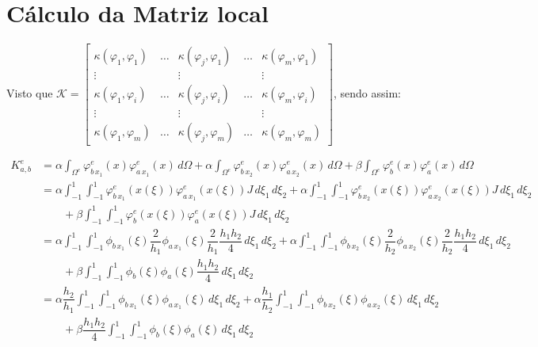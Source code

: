\section{Cálculo da Matriz local}

  Visto que $\displaystyle \mathcal{K} = \begin{bmatrix}
    \kappa(\varphi_1, \varphi_1) & \dots & \kappa(\varphi_j, \varphi_1) & \dots & \kappa(\varphi_m, \varphi_1)\\
    \vdots & & \vdots & & \vdots \\
    \kappa(\varphi_1, \varphi_i) & \dots & \kappa(\varphi_j, \varphi_i) & \dots & \kappa(\varphi_m, \varphi_i)\\
    \vdots & & \vdots & & \vdots \\
    \kappa(\varphi_1, \varphi_m) & \dots & \kappa(\varphi_j, \varphi_m) & \dots & \kappa(\varphi_m, \varphi_m)
  \end{bmatrix}$, sendo assim:

  \begin{align*}
    K^e_{a,b} &= \alpha \int_{\Omega^e} \varphi^e_{b\,x_1}(x) \varphi^e_{a\,x_1}(x) \, d\Omega + \alpha \int_{\Omega^e} \varphi^e_{b\,x_2}(x) \varphi^e_{a\,x_2}(x) \, d\Omega + \beta \int_{\Omega^e} \varphi^e_b(x) \varphi^e_a(x) \, d\Omega \\
    &= \alpha \int_{-1}^{1}\int_{-1}^{1} \varphi^e_{b\,x_1}(x(\xi)) \varphi^e_{a\,x_1}(x(\xi)) J \, d\xi_1 \, d\xi_2 + \alpha \int_{-1}^{1}\int_{-1}^{1} \varphi^e_{b\,x_2}(x(\xi)) \varphi^e_{a\,x_2}(x(\xi)) J \, d\xi_1 \, d\xi_2 \\
    &\quad\quad + \beta \int_{-1}^{1}\int_{-1}^{1} \varphi^e_b(x(\xi)) \varphi^e_a(x(\xi)) J \, d\xi_1 \, d\xi_2 \\
    &= \alpha \int_{-1}^{1}\int_{-1}^{1} \phi_{b\,x_1}(\xi)\dfrac{2}{h_1} \phi_{a\,x_1}(\xi)\dfrac{2}{h_1} \dfrac{h_1h_2}{4} \, d\xi_1 \, d\xi_2 + \alpha \int_{-1}^{1}\int_{-1}^{1} \phi_{b\,x_2}(\xi)\dfrac{2}{h_2} \phi_{a\,x_2}(\xi)\dfrac{2}{h_2} \dfrac{h_1h_2}{4} \, d\xi_1 \, d\xi_2 \\
    &\quad\quad + \beta \int_{-1}^{1}\int_{-1}^{1} \phi_b(\xi) \phi_a(\xi) \dfrac{h_1h_2}{4} \, d\xi_1 \, d\xi_2 \\
    &= \alpha\dfrac{h_2}{h_1} \int_{-1}^{1}\int_{-1}^{1} \phi_{b\,x_1}(\xi) \phi_{a\,x_1}(\xi) \, d\xi_1 \, d\xi_2
    + \alpha\dfrac{h_1}{h_2} \int_{-1}^{1}\int_{-1}^{1} \phi_{b\,x_2}(\xi) \phi_{a\,x_2}(\xi) \, d\xi_1 \,d\xi_2 \\
    &\quad\quad + \beta\dfrac{h_1h_2}{4} \int_{-1}^{1}\int_{-1}^{1} \phi_b(\xi) \phi_a(\xi) \, d\xi_1 \, d\xi_2
\end{align*}

